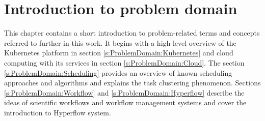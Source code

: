 \thispagestyle{only-cfoot}
\section{Introduction to problem domain}\label{s:ProblemDomain} %

This chapter contains a short introduction to problem-related terms and concepts referred to further in this work.
It begins with a high-level overview of the Kubernetes platform in section \ref{s:ProblemDomain:Kubernetes} and cloud computing with its services in section \ref{s:ProblemDomain:Cloud}.
The section \ref{s:ProblemDomain:Scheduling} provides an overview of known scheduling approaches and algorithms and explains the task clustering phenomenon.
Sections \ref{s:ProblemDomain:Workflow} and \ref{s:ProblemDomain:Hyperflow} describe the ideas of scientific workflows and workflow management systems and cover the introduction to Hyperflow system.











